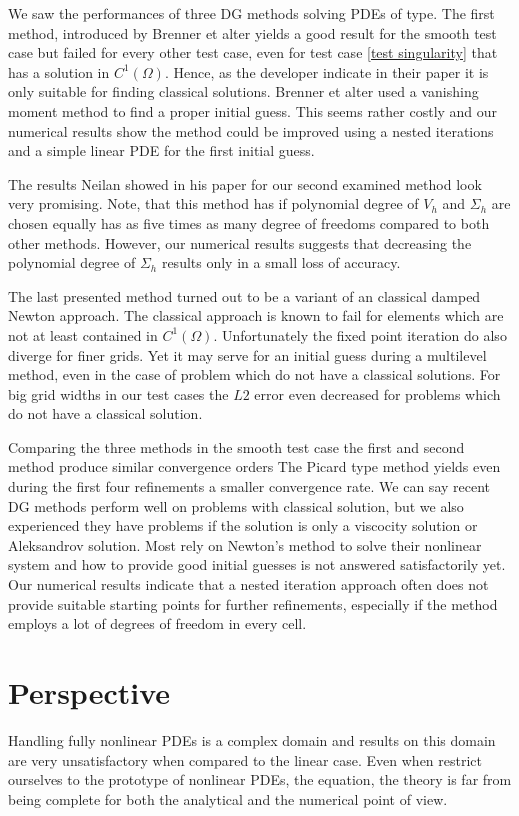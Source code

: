 We saw the performances of three DG methods solving PDEs of \MA type.
The first method, introduced by Brenner et alter yields a good result for the smooth test case but failed for every other test case, even for test case \ref{test singularity} that has a solution in $C^1(\Omega)$. Hence, as the developer indicate in their paper it is only suitable for finding classical solutions.
Brenner et alter used a vanishing moment method to find a proper initial guess. This seems rather costly and our numerical results show the method could be improved using a nested iterations and a simple linear PDE for the first initial guess.

The results Neilan showed in his paper for our second examined method look very promising.
Note, that this method has if polynomial degree of $V_h$ and $\Sigma_h$ are chosen equally has as five times as many degree of freedoms compared to both other methods. However, our numerical results suggests that decreasing the polynomial degree of $\Sigma_h$ results only in a small loss of accuracy.

The last presented method turned out to be a variant of an classical damped Newton approach. 
The classical approach is known to fail for elements which are not at least contained in $C^1(\Omega)$. Unfortunately the fixed point iteration do also diverge for finer grids. Yet it may serve for an initial guess during a multilevel method, even in the case of problem which do not have a classical solutions. For big grid widths in our test cases the $L2$ error even decreased for problems which do not have a classical solution.

Comparing the three methods in the smooth test case the first and second method produce similar convergence orders %
The Picard type method yields even during the first four refinements a smaller convergence rate. We can say recent DG methods perform well on problems with classical solution, but we also experienced they have problems if the \MA solution is only a viscocity solution or Aleksandrov solution. Most rely on Newton's method to solve their nonlinear system and how to provide good initial guesses is not answered satisfactorily yet.
Our numerical results indicate that a nested iteration approach often does not provide suitable starting points for further refinements, especially if the method employs a lot of degrees of freedom in every cell.

\section{Perspective}
Handling fully nonlinear PDEs is a complex domain and results on this domain are very unsatisfactory when compared to the linear case. Even when restrict ourselves to the prototype of nonlinear PDEs, the \MA equation, the theory is far from being complete for both the analytical and the numerical point of view.

